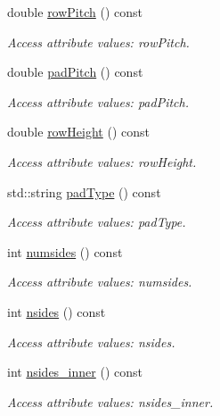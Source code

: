 \begin{DoxyCompactItemize}
double \hyperlink{struct_d_d4hep_1_1_x_m_l_1_1_child_value_a11129d15727a7490abcba854ef7af373}{row\+Pitch} () const
\begin{DoxyCompactList}\small\item\em Access attribute values\+: row\+Pitch. \end{DoxyCompactList}\item 
double \hyperlink{struct_d_d4hep_1_1_x_m_l_1_1_child_value_a5e1c0a5f057ea795316f5281f2ae2424}{pad\+Pitch} () const
\begin{DoxyCompactList}\small\item\em Access attribute values\+: pad\+Pitch. \end{DoxyCompactList}\item 
double \hyperlink{struct_d_d4hep_1_1_x_m_l_1_1_child_value_af2448e19096375c32e56faf96ce16ff1}{row\+Height} () const
\begin{DoxyCompactList}\small\item\em Access attribute values\+: row\+Height. \end{DoxyCompactList}\item 
std\+::string \hyperlink{struct_d_d4hep_1_1_x_m_l_1_1_child_value_ab642904dce35b222931f1521c360f21a}{pad\+Type} () const
\begin{DoxyCompactList}\small\item\em Access attribute values\+: pad\+Type. \end{DoxyCompactList}\item 
int \hyperlink{struct_d_d4hep_1_1_x_m_l_1_1_child_value_a34c77e7c81966b1421f32e58978931ae}{numsides} () const
\begin{DoxyCompactList}\small\item\em Access attribute values\+: numsides. \end{DoxyCompactList}\item 
int \hyperlink{struct_d_d4hep_1_1_x_m_l_1_1_child_value_afac8f929362411963a7d9e6dc1465c80}{nsides} () const
\begin{DoxyCompactList}\small\item\em Access attribute values\+: nsides. \end{DoxyCompactList}\item 
int \hyperlink{struct_d_d4hep_1_1_x_m_l_1_1_child_value_aa5f6774354d00d425835637387ae0136}{nsides\+\_\+inner} () const
\begin{DoxyCompactList}\small\item\em Access attribute values\+: nsides\+\_\+inner. \end{DoxyCompactList}\item 

\end{DoxyCompactItemize}
